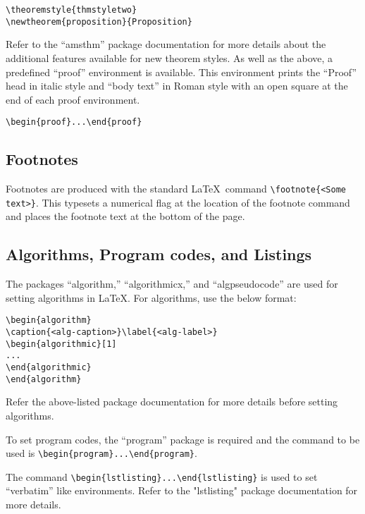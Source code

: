 \documentclass{article}
\begin{document}
\begin{verbatim}
\theoremstyle{thmstyletwo}
\newtheorem{proposition}{Proposition}
\end{verbatim}

Refer to the ``amsthm'' package documentation for more details about the additional features available for new theorem styles. As well as the above, a predefined ``proof'' environment is available. This environment prints the ``Proof'' head in italic style and ``body text'' in Roman style with an open square at the end of each proof environment.

\begin{verbatim}
\begin{proof}...\end{proof}
\end{verbatim}

\subsection{Footnotes}

Footnotes are produced with the standard \LaTeX\ command \verb+\footnote{<Some text>}+. This typesets a numerical flag at the location of the footnote command and places the footnote text at the bottom of the page.

\subsection{Algorithms, Program codes, and Listings}

The packages ``algorithm,'' ``algorithmicx,'' and ``algpseudocode'' are used for setting algorithms in \LaTeX. For algorithms, use the below format:

\begin{verbatim}
\begin{algorithm}
\caption{<alg-caption>}\label{<alg-label>}
\begin{algorithmic}[1]
...
\end{algorithmic}
\end{algorithm}
\end{verbatim}
Refer the above-listed package documentation for more details before setting algorithms.

To set program codes, the ``program'' package is required and the command to be used is \verb+\begin{program}...\end{program}+.

The command \verb+\begin{lstlisting}...\end{lstlisting}+ is used to set ``verbatim'' like environments. Refer to the "lstlisting" package documentation for more details.
\end{document}
